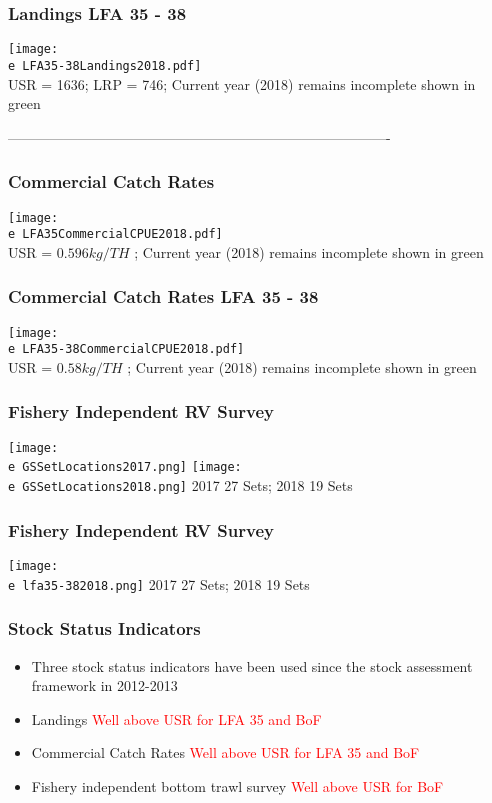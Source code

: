 \documentclass{beamer}
\newcommand{\e}{/SpinDr/backup/bio_data/bio.lobster/figures/}
\begin{document}
\begin{frame}
\frametitle{Landings LFA 35 - 38}
	\centering
	  \texttt{[image: \\e LFA35-38Landings2018.pdf]}\\[-1ex]
	{\tiny{USR = 1636; LRP = 746; Current year (2018) remains incomplete shown in green}}
\end{frame}

----------------------------------------------------------------------------------

\begin{frame}
\frametitle{Commercial Catch Rates}
	\centering
	  \texttt{[image: \\e LFA35CommercialCPUE2018.pdf]}\\[-1ex]
	{\tiny{USR = $0.596 kg/ TH$  ;  Current year (2018) remains incomplete shown in green}}
\end{frame}


\begin{frame}
\frametitle{Commercial Catch Rates LFA 35 - 38}
	\centering
	  \texttt{[image: \\e LFA35-38CommercialCPUE2018.pdf]}\\[-1ex]
	{\tiny{USR = $0.58 kg/ TH$  ;  Current year (2018) remains incomplete shown in green}}
\end{frame}


\begin{frame}
	\frametitle{Fishery Independent RV Survey}
		\centering
	  \texttt{[image: \\e GSSetLocations2017.png]}
	  \texttt{[image: \\e GSSetLocations2018.png]}
	  {\tiny{2017 27 Sets; 2018 19 Sets}}
\end{frame}


\begin{frame}
	\frametitle{Fishery Independent RV Survey}
		\centering
	  \texttt{[image: \\e lfa35-382018.png]}
	  {\tiny{2017 27 Sets; 2018 19 Sets}}
\end{frame}


\begin{frame}

	\frametitle{Stock Status Indicators}

	\begin{itemize}
		\item Three stock status indicators have been used since the stock assessment framework in 2012-2013
		\item Landings \textcolor{red}{Well above USR for LFA 35 and BoF}
		\item Commercial Catch Rates \textcolor{red}{Well above USR for LFA 35 and BoF}
		\item Fishery independent bottom trawl survey \textcolor{red}{Well above USR for BoF}
	\end{itemize}
\end{frame}
\end{document}
